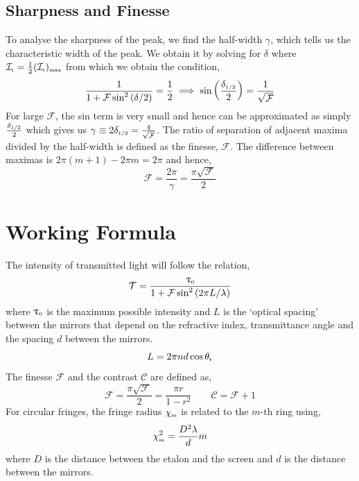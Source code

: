 \subsection{Sharpness and Finesse}
To analyse the sharpness of the peak, we find the half-width $\gamma$, which tells us the characteristic width of the peak. We obtain it by solving for $\delta$ where $\mathcal{I}_{\text{\tiny t}} = \frac{1}{2}(\mathcal{I}_{\text{\tiny t}})_{\text{\tiny max}}$ from which we obtain the condition, 
\begin{equation}
    \begin{split}
        \frac{1}{1+\mathcal{F}\sin^2\qty(\delta/2)} = \frac{1}{2}\implies \sin\qty(\frac{\delta_{\text{\tiny 1/2}}}{2}) = \frac{1}{\sqrt{\mathcal{F}}}
    \end{split}
\end{equation}
For large $\mathcal{F}$, the sin term is very small and hence can be approximated as simply $\frac{\delta_{\text{\tiny 1/2}}}{2}$ which gives us $\gamma \equiv 2\delta_{\text{\tiny 1/2}} = \frac{4}{\sqrt{\mathcal{F}}}$. The ratio of separation of adjacent maxima divided by the half-width is defined as the finesse, $\mathscr{F}$. The difference between maximas is $2\pi (m+1) - 2\pi m = 2\pi$ and hence, 
\begin{equation}
    \mathscr{F} = \frac{2\pi}{\gamma} = \frac{\pi\sqrt{\mathcal{F}}}{2}
\end{equation}
\section{Working Formula}
The intensity of transmitted light will follow the relation, 
\begin{equation}\label{trans}
    \mathcal{T} = \frac{\uptau_{\text{\tiny 0}}}{1+\mathcal{F}\sin^2\qty(2\pi L/\lambda)}
\end{equation}
where $\uptau_{\text{\tiny 0}}$ is the maximum possible intensity and $L$ is the `optical spacing' between the mirrors that depend on the refractive index, transmittance angle and the spacing $d$ between the mirrors. 
\begin{equation}
    L = 2\pi n d \cos\theta_{\text{\tiny t}}
\end{equation}
The finesse  $\mathscr{F}$ and the contrast $\mathcal{C}$ are defined as,
\begin{equation}\label{findef}
     \mathscr{F}=\frac{\pi\sqrt{\mathcal{F}}}{2} = \frac{\pi r}{1-r^2}\qquad \mathcal{C} = \mathscr{F}+1
\end{equation}
For circular fringes, the fringe radius $\chi_{\text{\tiny m}}$ is related to the $m$-th ring using, 
\begin{equation}\label{radius}
    \chi_{\text{\tiny m}}^2 = \frac{D^2 \lambda}{d} m
\end{equation}
where $D$ is the distance between the etalon and the screen and $d$ is the distance between the mirrors. 